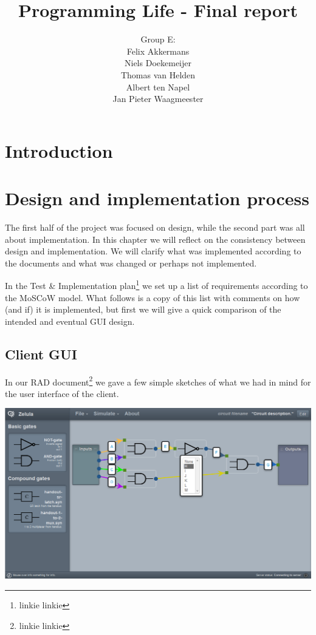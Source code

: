 \documentclass[a4paper]{article}
\title{Programming Life - Final report}
\author{Group E:\\
Felix Akkermans \\
Niels Doekemeijer \\
Thomas van Helden \\
Albert ten Napel \\
Jan Pieter Waagmeester}
\begin{document}
\maketitle

\vfill

\small{\tableofcontents}
\pagebreak



\section{Introduction}


\section{Design and implementation process}
The first half of the project was focused on design, while the second part was all about implementation. In this chapter we will reflect on the consistency between design and implementation. We will clarify what was implemented according to the documents and what was changed or perhaps not implemented.

In the Test \& Implementation plan\footnote{linkie linkie} we set up a list of requirements according to the MoSCoW model. What follows is a copy of this list with comments on how (and if) it is implemented, but first we will give a quick comparison of the intended and eventual GUI design.

\subsection{Client GUI}
In our RAD document\footnote{linkie linkie} we gave a few simple sketches of what we had in mind for the user interface of the client.

\includegraphics[width=15cm]{pictures/gui_final1.png}
\end{document}
